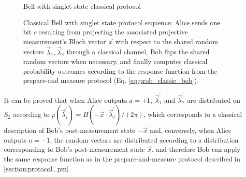 \begin{figure}[tb]
\begin{center}
\begin{msc}[msc keyword=, instance width=3.6cm]{Bell with singlet state classical protocol}
\nextlevel[3]
\nextlevel[3]
\nextlevel[1]
\nextlevel[3]
\nextlevel[2]
\end{msc}
\end{center}
\caption{Classical Bell with singlet state protocol sequence: Alice sends one bit $c$ resulting from projecting the associated projective measurement's Bloch vector $\vec{x}$ with respect to the shared random vectors $\vec{\lambda}_1, \vec{\lambda}_2$ through a classical channel, Bob flips the shared random vectors when necessary, and finally computes classical probability outcomes according to the response function from the prepare-and measure protocol (Eq. \ref{eq:prob_classic_bob}).}
\label{fig:msc_bell}
\end{figure}

It can be proved that when Alice outputs $a=+1$, $\vec{\lambda}^{\prime}_1$ and $\vec{\lambda}^{\prime}_2$ are distributed on $S_2$ according to $\rho(\vec{\lambda}^{\prime}_i) = H(-\vec{x} \cdot \vec{\lambda}^{\prime}_i)/(2\pi)$, which corresponds to a classical description of Bob's post-measurement state $-\vec{x}$ and, conversely, when Alice outputs $a=-1$, the random vectors are distributed according to a distribution corresponding to Bob's post-measurement state $\vec{x}$, and therefore Bob can apply the same response function as in the prepare-and-measure protocol described in \ref{section:protocol_pm}. 